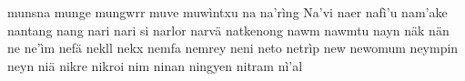 munsna\hspace{2mm}
munge\hspace{2mm}
mungwrr\hspace{2mm}
muve\hspace{2mm}
muwìntxu\hspace{2mm}
na\hspace{2mm}
na'rìng\hspace{2mm}
Na'vi\hspace{2mm}
naer\hspace{2mm}
nafì'u\hspace{2mm}
nam'ake\hspace{2mm}
nantang\hspace{2mm}
nang\hspace{2mm}
nari\hspace{2mm}
nari si\hspace{2mm}
narlor\hspace{2mm}
narvä\hspace{2mm}
natkenong\hspace{2mm}
nawm\hspace{2mm}
nawmtu\hspace{2mm}
nayn\hspace{2mm}
näk\hspace{2mm}
nän\hspace{2mm}
ne\hspace{2mm}
ne'ìm\hspace{2mm}
nefä\hspace{2mm}
nekll\hspace{2mm}
nekx\hspace{2mm}
nemfa\hspace{2mm}
nemrey\hspace{2mm}
neni\hspace{2mm}
neto\hspace{2mm}
netrìp\hspace{2mm}
new\hspace{2mm}
newomum\hspace{2mm}
neympin\hspace{2mm}
neyn\hspace{2mm}
niä\hspace{2mm}
nikre\hspace{2mm}
nikroi\hspace{2mm}
nim\hspace{2mm}
ninan\hspace{2mm}
ningyen\hspace{2mm}
nitram\hspace{2mm}
nì'al\hspace{2mm}
